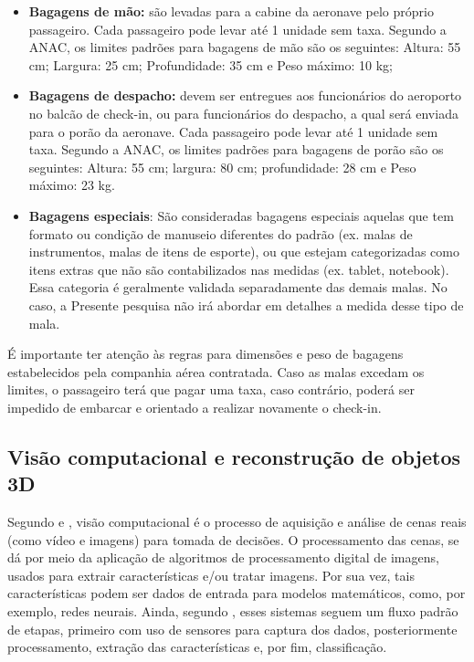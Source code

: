     \begin{itemize}
        \item \textbf{Bagagens de mão:} são levadas para a cabine da aeronave pelo próprio passageiro. Cada passageiro pode levar até 1 unidade sem taxa. Segundo a ANAC, os limites padrões para bagagens de mão são os seguintes: Altura: 55 cm; Largura: 25 cm; Profundidade: 35 cm e Peso máximo: 10 kg;
        \item \textbf{Bagagens de despacho:} devem ser entregues aos funcionários do aeroporto no balcão de check-in, ou para funcionários do despacho, a qual será enviada para o porão da aeronave. Cada passageiro pode levar até 1 unidade sem taxa. Segundo a ANAC, os limites padrões para bagagens de porão são os seguintes: Altura: 55 cm; largura: 80 cm; profundidade: 28 cm e Peso máximo: 23 kg.
        \item \textbf{Bagagens especiais}: São consideradas bagagens especiais aquelas que tem formato ou condição de manuseio diferentes do padrão (ex. malas de instrumentos, malas de itens de esporte), ou que estejam categorizadas como itens extras que não são contabilizados nas medidas (ex. tablet, notebook). Essa categoria é geralmente validada separadamente das demais malas. No caso, a Presente pesquisa não irá abordar em detalhes a medida desse tipo de mala.
    \end{itemize}
    
    É importante ter atenção às regras para dimensões e peso de bagagens estabelecidos pela companhia aérea contratada. Caso as malas excedam os limites, o passageiro terá que pagar uma taxa, caso contrário, poderá ser impedido de embarcar e orientado a realizar novamente o check-in. 


\subsection{Visão computacional e reconstrução de objetos 3D}
\label{subsec_Visão computacional e reconstrução de objetos 3D}

    Segundo  e , visão computacional é o processo de aquisição e análise de cenas reais (como vídeo e imagens) para tomada de decisões. O processamento das cenas, se dá por meio da aplicação de algoritmos de processamento digital de imagens, usados para extrair características e/ou tratar imagens. Por sua vez, tais características podem ser dados de entrada para modelos matemáticos, como, por exemplo, redes neurais. Ainda, segundo , esses sistemas seguem um fluxo padrão de etapas, primeiro com uso de sensores para captura dos dados, posteriormente processamento, extração das características e, por fim, classificação.

